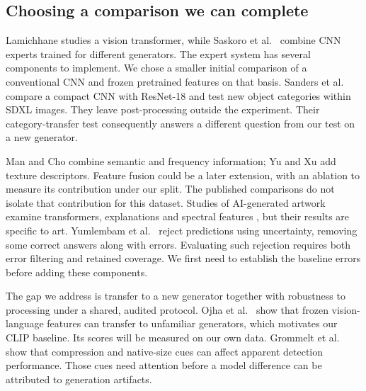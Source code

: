 \documentclass[pdflatex]{sn-jnl}
\begin{document}
\subsection{Choosing a comparison we can complete}
Lamichhane \citep{lamichhane2025} studies a vision transformer, while Saskoro et al.\ \citep{saskoro2024} combine CNN experts trained for different generators. The expert system has several components to implement. We chose a smaller initial comparison of a conventional CNN and frozen pretrained features on that basis. Sanders et al.\ \citep{sanders2026} compare a compact CNN with ResNet-18 and test new object categories within SDXL images. They leave post-processing outside the experiment. Their category-transfer test consequently answers a different question from our test on a new generator.

Man and Cho \citep{man2026} combine semantic and frequency information; Yu and Xu \citep{yu2025} add texture descriptors. Feature fusion could be a later extension, with an ablation to measure its contribution under our split. The published comparisons do not isolate that contribution for this dataset. Studies of AI-generated artwork examine transformers, explanations and spectral features \citep{yinghua2026,scadet2025}, but their results are specific to art. Yumlembam et al.\ \citep{yumlembam2025} reject predictions using uncertainty, removing some correct answers along with errors. Evaluating such rejection requires both error filtering and retained coverage. We first need to establish the baseline errors before adding these components.

The gap we address is transfer to a new generator together with robustness to processing under a shared, audited protocol. Ojha et al.\ \citep{ojha2023} show that frozen vision-language features can transfer to unfamiliar generators, which motivates our CLIP baseline. Its scores will be measured on our own data. Grommelt et al.\ \citep{grommelt2025} show that compression and native-size cues can affect apparent detection performance. Those cues need attention before a model difference can be attributed to generation artifacts.



\clearpage

\clearpage



\end{document}
